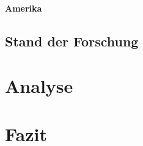 \documentclass[12pt,ngerman,parskip=half]{scrreprt}
\begin{document}
\blindtext 

\blindtext

\blindtext

\subsubsection{Amerika}

\blindtext 

\blindtext

\blindtext


\section{Stand der Forschung}



\chapter{Analyse}


\chapter{Fazit}
\end{document}
